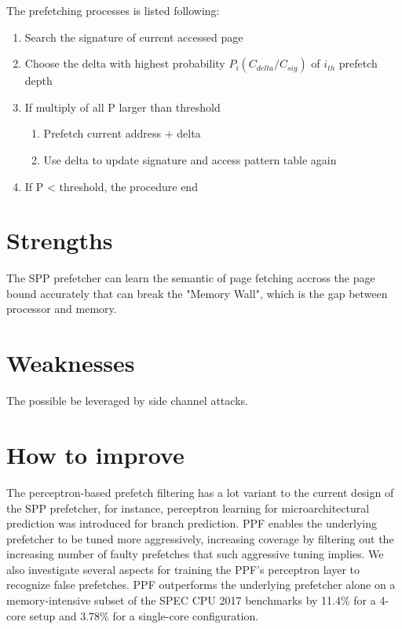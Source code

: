 \documentclass[letterpaper,12pt]{article}
\begin{document}
The prefetching processes is listed following:
\begin{enumerate}
  \item Search the signature of
        current accessed page
  \item Choose the delta with highest
        probability $P_i
          (C_{delta}/C_{sig})$ of $i_{th}$
        prefetch depth
  \item If multiply of all P larger than
        threshold
        \begin{enumerate}
          \item Prefetch current address +
                delta
          \item Use delta to update signature
                and access pattern table
                again
        \end{enumerate}
  \item If P < threshold, the procedure end
\end{enumerate}
\section{Strengths}
 The SPP prefetcher can learn the semantic of page fetching accross the page bound accurately that can break the "Memory Wall", which is the gap between processor and memory.

\section{Weaknesses}
 The possible be leveraged by side channel attacks.
\section{How to improve}
The perceptron-based prefetch filtering\cite{10.1145} has a lot variant to the current design of the SPP prefetcher, for instance, perceptron learning for microarchitectural prediction was introduced for branch prediction. PPF enables the underlying prefetcher to be tuned more aggressively, increasing coverage by filtering out the increasing number of faulty prefetches that such aggressive tuning implies. We also investigate several aspects for training the PPF's perceptron layer to recognize false prefetches. PPF outperforms the underlying prefetcher alone on a memory-intensive subset of the SPEC CPU 2017 benchmarks by 11.4\% for a 4-core setup and 3.78\% for a single-core configuration.
\end{document}
